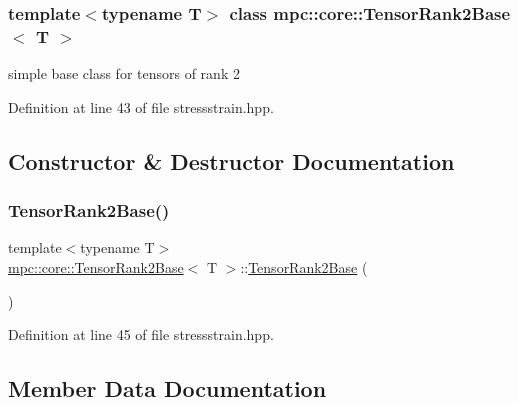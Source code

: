 \subsubsection*{template$<$typename T$>$\newline
class mpc\+::core\+::\+Tensor\+Rank2\+Base$<$ T $>$}

simple base class for tensors of rank 2 

Definition at line 43 of file stressstrain.\+hpp.



\subsection{Constructor \& Destructor Documentation}
\mbox{\label{structmpc_1_1core_1_1_tensor_rank2_base_adf3208464cf45f6caf3c78dee1a3c7d1}} 
\subsubsection{\texorpdfstring{Tensor\+Rank2\+Base()}{TensorRank2Base()}}
{\footnotesize\ttfamily template$<$typename T$>$ \\
\mbox{\hyperlink{structmpc_1_1core_1_1_tensor_rank2_base}{mpc\+::core\+::\+Tensor\+Rank2\+Base}}$<$ T $>$\+::\mbox{\hyperlink{structmpc_1_1core_1_1_tensor_rank2_base}{Tensor\+Rank2\+Base}} (\begin{DoxyParamCaption}{ }\end{DoxyParamCaption})\hspace{0.3cm}{\ttfamily [inline]}}



Definition at line 45 of file stressstrain.\+hpp.



\subsection{Member Data Documentation}
\mbox{\label{structmpc_1_1core_1_1_tensor_rank2_base_a75703dce1b26306b8f0ee539775ee6d7}} 
